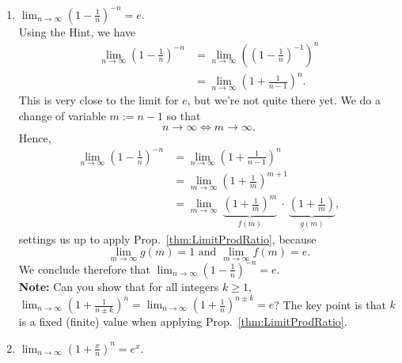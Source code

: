 \begin{enumerate}
\renewcommand{\labelenumi}{(\alph{enumi})}
\setlength{\itemsep}{.2cm}

\item \Ans $\displaystyle \lim_{n \to \infty} \left( 1 - \frac{1}{n} \right)^{-n} = e$.\\

Using the Hint, we have
\begin{align*}
    \lim_{n \to \infty} \left( 1 - \frac{1}{n} \right)^{-n} & = \lim_{n \to \infty} \left( \left( 1 - \frac{1}{n} \right)^{-1} \right)^n \\
    & = \lim_{n \to \infty} \left( 1 + \frac{1}{n-1} \right)^{n}.
\end{align*}
This is very close to the limit for $e$, but we're not quite there yet. We do a change of variable $m := n-1$ so that
$$n \to \infty \iff m \to \infty. $$
Hence, 
\begin{align*}
    \lim_{n \to \infty} \left( 1 - \frac{1}{n} \right)^{-n} & =\lim_{n \to \infty} \left( 1 + \frac{1}{n-1} \right)^{n} \\
    & = \lim_{m \to \infty} \left( 1 + \frac{1}{m} \right)^{m+1} \\
    & = \lim_{m \to \infty}~ \underbrace{\left( 1 + \frac{1}{m} \right)^{m}}_{f(m)} ~\cdot ~\underbrace{\left( 1 + \frac{1}{m} \right)}_{g(m)},    
\end{align*}
settings us up to apply Prop.~\ref{thm:LimitProdRatio}, because
$$ \lim_{m \to \infty} g(m) = 1 \text{ and }  \lim_{m \to \infty} f(m) = e.$$
We conclude therefore that $\displaystyle \lim_{n \to \infty} \left( 1 - \frac{1}{n} \right)^{-n} = e$.\\

\textbf{Note:} Can you show that for all integers $k\ge 1$, $\displaystyle \lim_{n \to \infty} \left( 1 + \frac{1}{n \pm k} \right)^{n} = \lim_{n \to \infty} \left( 1 + \frac{1}{n} \right)^{n \pm k}= e$? The key point is that $k$ is a fixed (finite) value when applying  Prop.~\ref{thm:LimitProdRatio}.

\item \Ans $\displaystyle \lim_{n \to \infty} \left( 1 + \frac{x}{n} \right)^n = e^x$.\\


\end{enumerate}
